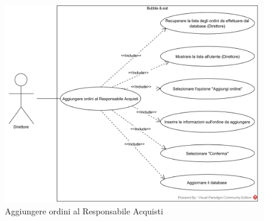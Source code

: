 
\begin{figure}[H]
	\centering
	\includegraphics[width=15cm]{../../documenti/AnalisiDeiRequisiti/Diagrammi_img/uc3_14.png}
	\caption{\UCCaption{} Aggiungere ordini al Responsabile Acquisti}
\end{figure}

